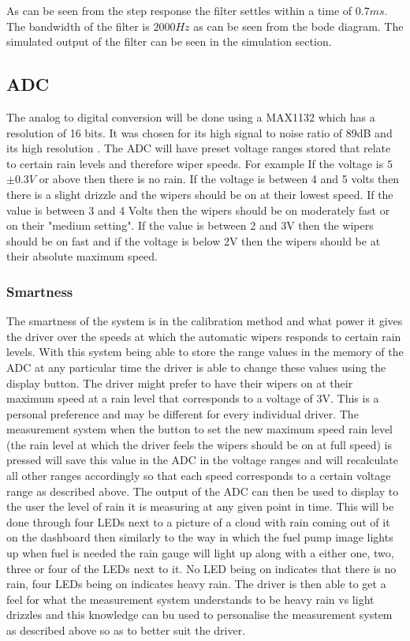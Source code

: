 \documentclass[conference, 11pt]{IEEEtran}
\begin{document}
As can be seen from the step response the filter settles within a time of $0.7ms$. The bandwidth of the filter is $2000Hz$ as can be seen from the bode diagram. The simulated output of the filter can be seen in the simulation section. 


\subsection*{ADC}
The analog to digital conversion will be done using a MAX1132 which has a resolution of 16 bits. It was chosen for its high signal to noise ratio of 89dB and its high resolution \cite{ADC}. The ADC will have preset voltage ranges stored that relate to certain rain levels and therefore wiper speeds. For example If the voltage is $5$ $\pm 0.3V$ or above then there is no rain. If the voltage is between 4 and 5 volts then there is a slight drizzle and the wipers should be on at their lowest speed. If the value is between 3 and 4 Volts then the wipers should be on moderately fast or on their "medium setting". If the value is between 2 and 3V then the wipers should be on fast and if the voltage is below 2V then the wipers should be at their absolute maximum speed.

\subsubsection{Smartness}
The smartness of the system is in the calibration method and what power it gives the driver over the speeds at which the automatic wipers responds to certain rain levels. With this system being able to store the range values in the memory of the ADC at any particular time the driver is able to change these values using the display button. The driver might prefer to have their wipers on at their maximum speed at a rain level that corresponds to a voltage of 3V. This is a personal preference and may be different for every individual driver. The measurement system when the button to set the new maximum speed rain level (the rain level at which the driver feels the wipers should be on at full speed) is pressed will save this value in the ADC in the voltage ranges and will recalculate all other ranges accordingly so that each speed corresponds to a certain voltage range as described above. The output of the ADC can then be used to display to the user the level of rain it is measuring at any given point in time. This will be done through four LEDs next to a picture of a cloud with rain coming out of it on the dashboard then similarly to the way in which the fuel pump image lights up when fuel is needed the rain gauge will light up along with a either one, two, three or four of the LEDs next to it. No LED being on indicates that there is no rain, four LEDs being on indicates heavy rain. The driver is then able to get a feel for what the measurement system understands to be heavy rain vs light drizzles and this knowledge can bu used to personalise the measurement system as described above so as to better suit the driver. 
\end{document}
